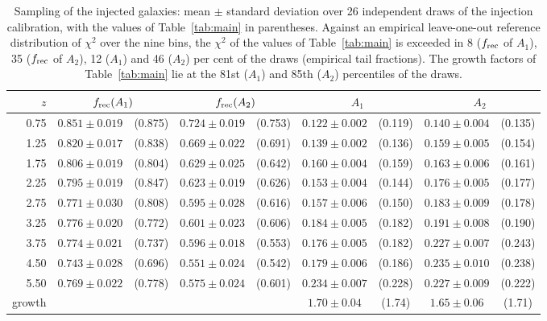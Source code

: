 \documentclass[fleqn,usenatbib]{mnras}
\begin{document}
\begin{table}
\centering
\caption{Sampling of the injected galaxies: mean $\pm$ standard
deviation over 26 independent draws of the injection calibration, with the
values of Table~\ref{tab:main} in parentheses. Against an empirical
leave-one-out reference distribution of $\chi^2$ over the nine bins, the
$\chi^2$ of the values of Table~\ref{tab:main} is exceeded in 8
($f_{\rm rec}$ of $A_1$), 35 ($f_{\rm rec}$ of $A_2$), 12 ($A_1$) and 46
($A_2$) per cent of the draws (empirical tail fractions). The growth factors of
Table~\ref{tab:main} lie at the 81st ($A_1$) and 85th ($A_2$) percentiles of the
draws.}
\label{tab:seeds}
\small
\begin{tabular}{rcccccccc}
\hline
{$z$} & \multicolumn{2}{c}{$f_{\rm rec}(A_1)$} & \multicolumn{2}{c}{$f_{\rm rec}(A_2)$} &
\multicolumn{2}{c}{$A_1$} & \multicolumn{2}{c}{$A_2$}
\\
\hline
0.75 & $0.851\pm0.019$ & (0.875) & $0.724\pm0.019$ & (0.753) & $0.122\pm0.002$ & (0.119) & $0.140\pm0.004$ & (0.135)\\
1.25 & $0.820\pm0.017$ & (0.838) & $0.669\pm0.022$ & (0.691) & $0.139\pm0.002$ & (0.136) & $0.159\pm0.005$ & (0.154)\\
1.75 & $0.806\pm0.019$ & (0.804) & $0.629\pm0.025$ & (0.642) & $0.160\pm0.004$ & (0.159) & $0.163\pm0.006$ & (0.161)\\
2.25 & $0.795\pm0.019$ & (0.847) & $0.623\pm0.019$ & (0.626) & $0.153\pm0.004$ & (0.144) & $0.176\pm0.005$ & (0.177)\\
2.75 & $0.771\pm0.030$ & (0.808) & $0.595\pm0.028$ & (0.616) & $0.157\pm0.006$ & (0.150) & $0.183\pm0.009$ & (0.178)\\
3.25 & $0.776\pm0.020$ & (0.772) & $0.601\pm0.023$ & (0.606) & $0.184\pm0.005$ & (0.182) & $0.191\pm0.008$ & (0.190)\\
3.75 & $0.774\pm0.021$ & (0.737) & $0.596\pm0.018$ & (0.553) & $0.176\pm0.005$ & (0.182) & $0.227\pm0.007$ & (0.243)\\
4.50 & $0.743\pm0.028$ & (0.696) & $0.551\pm0.024$ & (0.542) & $0.179\pm0.006$ & (0.186) & $0.235\pm0.010$ & (0.238)\\
5.50 & $0.769\pm0.022$ & (0.778) & $0.575\pm0.024$ & (0.601) & $0.234\pm0.007$ & (0.228) & $0.227\pm0.009$ & (0.222)\\
\hline
growth & & & & & $1.70\pm0.04$ & (1.74) & $1.65\pm0.06$ & (1.71)\\
\hline
\end{tabular}
\end{table}
\end{document}
